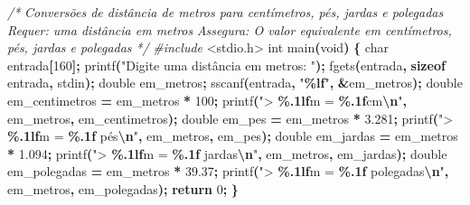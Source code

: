 \documentclass[
  11pt,
  a4paper,
]{scrbook}
\newenvironment{Shaded}{\begin{snugshade}}{\end{snugshade}}
\newcommand{\CommentTok}[1]{\textcolor[rgb]{0.56,0.35,0.01}{\textit{#1}}}
\newcommand{\ControlFlowTok}[1]{\textcolor[rgb]{0.13,0.29,0.53}{\textbf{#1}}}
\newcommand{\DataTypeTok}[1]{\textcolor[rgb]{0.13,0.29,0.53}{#1}}
\newcommand{\DecValTok}[1]{\textcolor[rgb]{0.00,0.00,0.81}{#1}}
\newcommand{\FloatTok}[1]{\textcolor[rgb]{0.00,0.00,0.81}{#1}}
\newcommand{\ImportTok}[1]{#1}
\newcommand{\KeywordTok}[1]{\textcolor[rgb]{0.13,0.29,0.53}{\textbf{#1}}}
\newcommand{\NormalTok}[1]{#1}
\newcommand{\OperatorTok}[1]{\textcolor[rgb]{0.81,0.36,0.00}{\textbf{#1}}}
\newcommand{\PreprocessorTok}[1]{\textcolor[rgb]{0.56,0.35,0.01}{\textit{#1}}}
\newcommand{\SpecialCharTok}[1]{\textcolor[rgb]{0.81,0.36,0.00}{\textbf{#1}}}
\newcommand{\StringTok}[1]{\textcolor[rgb]{0.31,0.60,0.02}{#1}}
\begin{document}
\begin{Shaded}
\begin{Highlighting}[]
\CommentTok{/*}
\CommentTok{Conversões de distância de metros para centímetros, pés, jardas e polegadas}
\CommentTok{Requer: uma distância em metros}
\CommentTok{Assegura: O valor equivalente em centímetros, pés, jardas e polegadas}
\CommentTok{*/}
\PreprocessorTok{\#include }\ImportTok{\textless{}stdio.h\textgreater{}}
\DataTypeTok{int}\NormalTok{ main}\OperatorTok{(}\DataTypeTok{void}\OperatorTok{)} \OperatorTok{\{}
 \DataTypeTok{char}\NormalTok{ entrada}\OperatorTok{[}\DecValTok{160}\OperatorTok{];}
\NormalTok{    printf}\OperatorTok{(}\StringTok{"Digite uma distância em metros: "}\OperatorTok{);}
\NormalTok{   fgets}\OperatorTok{(}\NormalTok{entrada}\OperatorTok{,} \KeywordTok{sizeof}\NormalTok{ entrada}\OperatorTok{,}\NormalTok{ stdin}\OperatorTok{);}
  \DataTypeTok{double}\NormalTok{ em\_metros}\OperatorTok{;}
\NormalTok{    sscanf}\OperatorTok{(}\NormalTok{entrada}\OperatorTok{,} \StringTok{"}\SpecialCharTok{\%lf}\StringTok{"}\OperatorTok{,} \OperatorTok{\&}\NormalTok{em\_metros}\OperatorTok{);}
        \DataTypeTok{double}\NormalTok{ em\_centimetros }\OperatorTok{=}\NormalTok{ em\_metros }\OperatorTok{*} \DecValTok{100}\OperatorTok{;}
\NormalTok{       printf}\OperatorTok{(}\StringTok{"\textgreater{} }\SpecialCharTok{\%.1lf}\StringTok{m = }\SpecialCharTok{\%.1f}\StringTok{cm}\SpecialCharTok{\textbackslash{}n}\StringTok{"}\OperatorTok{,}\NormalTok{ em\_metros}\OperatorTok{,}\NormalTok{ em\_centimetros}\OperatorTok{);}
       \DataTypeTok{double}\NormalTok{ em\_pes }\OperatorTok{=}\NormalTok{ em\_metros }\OperatorTok{*} \FloatTok{3.281}\OperatorTok{;}
\NormalTok{       printf}\OperatorTok{(}\StringTok{"\textgreater{} }\SpecialCharTok{\%.1lf}\StringTok{m = }\SpecialCharTok{\%.1f}\StringTok{ pés}\SpecialCharTok{\textbackslash{}n}\StringTok{"}\OperatorTok{,}\NormalTok{ em\_metros}\OperatorTok{,}\NormalTok{ em\_pes}\OperatorTok{);}
          \DataTypeTok{double}\NormalTok{ em\_jardas }\OperatorTok{=}\NormalTok{ em\_metros }\OperatorTok{*} \FloatTok{1.094}\OperatorTok{;}
\NormalTok{        printf}\OperatorTok{(}\StringTok{"\textgreater{} }\SpecialCharTok{\%.1lf}\StringTok{m = }\SpecialCharTok{\%.1f}\StringTok{ jardas}\SpecialCharTok{\textbackslash{}n}\StringTok{"}\OperatorTok{,}\NormalTok{ em\_metros}\OperatorTok{,}\NormalTok{ em\_jardas}\OperatorTok{);}
     \DataTypeTok{double}\NormalTok{ em\_polegadas }\OperatorTok{=}\NormalTok{ em\_metros }\OperatorTok{*} \FloatTok{39.37}\OperatorTok{;}
\NormalTok{        printf}\OperatorTok{(}\StringTok{"\textgreater{} }\SpecialCharTok{\%.1lf}\StringTok{m = }\SpecialCharTok{\%.1f}\StringTok{ polegadas}\SpecialCharTok{\textbackslash{}n}\StringTok{"}\OperatorTok{,}\NormalTok{ em\_metros}\OperatorTok{,}\NormalTok{ em\_polegadas}\OperatorTok{);}
  \ControlFlowTok{return} \DecValTok{0}\OperatorTok{;}
\OperatorTok{\}}
\end{Highlighting}
\end{Shaded}
\end{document}
